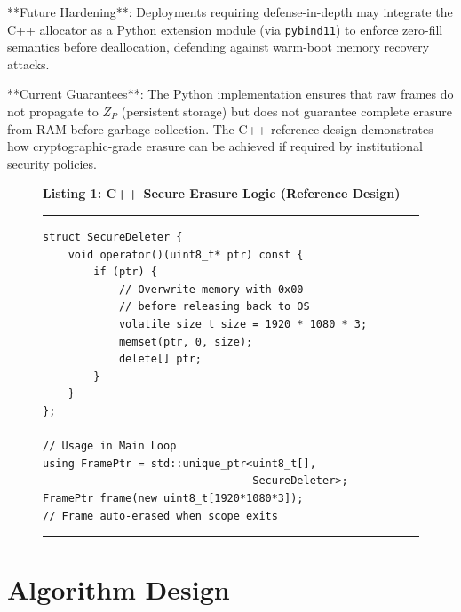 \documentclass[conference]{IEEEtran}
\begin{document}
**Future Hardening**: Deployments requiring defense-in-depth may integrate the C++ allocator as a Python extension module (via \texttt{pybind11}) to enforce zero-fill semantics before deallocation, defending against warm-boot memory recovery attacks.

**Current Guarantees**: The Python implementation ensures that raw frames do not propagate to $Z_P$ (persistent storage) but does not guarantee complete erasure from RAM before garbage collection. The C++ reference design demonstrates how cryptographic-grade erasure can be achieved if required by institutional security policies.

\begin{figure}[t!] 
\centering
\textbf{Listing 1: C++ Secure Erasure Logic (Reference Design)}
\hrule
\vspace{0.1cm}
\small
\begin{verbatim}
struct SecureDeleter {
    void operator()(uint8_t* ptr) const {
        if (ptr) {
            // Overwrite memory with 0x00
            // before releasing back to OS
            volatile size_t size = 1920 * 1080 * 3;
            memset(ptr, 0, size);
            delete[] ptr;
        }
    }
};

// Usage in Main Loop
using FramePtr = std::unique_ptr<uint8_t[], 
                                 SecureDeleter>;
FramePtr frame(new uint8_t[1920*1080*3]);
// Frame auto-erased when scope exits
\end{verbatim}
\hrule
\vspace{-0.2cm} 
\label{code:secure}
\end{figure}

\section{Algorithm Design}
\end{document}
